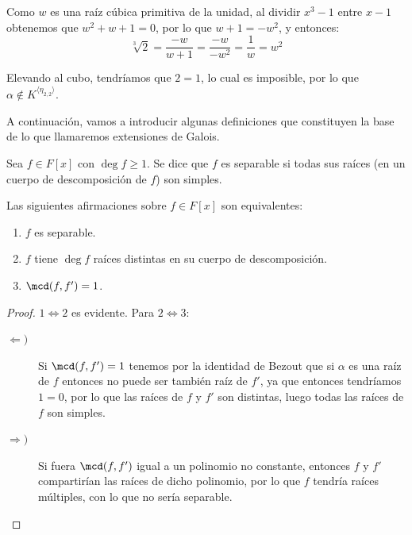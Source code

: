 \begin{ejercicio}
\begin{itemize}
        Como $w$ es una raíz cúbica primitiva de la unidad, al dividir $x^3-1$ entre $x-1$ obtenemos que $w^2+w+1=0$, por lo que $w+1=-w^2$, y entonces:
        \begin{equation*}
            \sqrt[3]{2} = \frac{-w}{w+1} = \frac{-w}{-w^2} = \frac{1}{w} = w^2
        \end{equation*}

        Elevando al cubo, tendríamos que $2 = 1$, lo cual es imposible, por lo que $\alpha\notin K^{\langle \eta_{2,2} \rangle }$.
    \end{itemize}
\end{ejercicio}


A continuación, vamos a introducir algunas definiciones que constituyen la base de lo que llamaremos extensiones de Galois.
\begin{definicion}
    Sea $f\in F[x]$ con $\deg f \geq 1$. Se dice que $f$ es separable si todas sus raíces (en un cuerpo de descomposición de $f$) son simples.
\end{definicion}

\begin{observacion}
    Las siguientes afirmaciones sobre $f\in F[x]$ son equivalentes:
    \begin{enumerate}
        \item $f$ es separable.
        \item $f$ tiene $\deg f$ raíces distintas en su cuerpo de descomposición.
        \item $\mcd (f,f') = 1$.
    \end{enumerate}
    \begin{proof}
        $1\Longleftrightarrow 2$ es evidente. Para $2\Longleftrightarrow 3$:
        \begin{description}
            \item [$\Longleftarrow )$] Si $\mcd (f,f') = 1$ tenemos por la identidad de Bezout que si $\alpha$ es una raíz de $f$ entonces no puede ser también raíz de $f'$, ya que entonces tendríamos $1=0$, por lo que las raíces de $f$ y $f'$ son distintas, luego todas las raíces de $f$ son simples.
            \item [$\Longrightarrow )$] Si fuera $\mcd(f,f')$ igual a un polinomio no constante, entonces $f$ y $f'$ compartirían las raíces de dicho polinomio, por lo que $f$ tendría raíces múltiples, con lo que no sería separable.
        \end{description}
    \end{proof}
\end{observacion}

